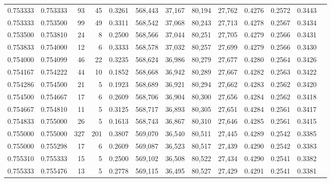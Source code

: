 \begin{tabular}{rrrrrrrrrrrrr}
0.753333 & 0.753333 &    93 &  45 &                                     0.3261 & 568,443 &  37,167 &  80,194 &  27,762 & 0.4276 & 0.2572 & 0.3443 \\
0.753333 & 0.753500 &    99 &  49 &                                     0.3311 & 568,542 &  37,068 &  80,243 &  27,713 & 0.4278 & 0.2567 & 0.3434 \\
0.753500 & 0.753810 &    24 &   8 &                                     0.2500 & 568,566 &  37,044 &  80,251 &  27,705 & 0.4279 & 0.2566 & 0.3431 \\
0.753833 & 0.754000 &    12 &   6 &                                     0.3333 & 568,578 &  37,032 &  80,257 &  27,699 & 0.4279 & 0.2566 & 0.3430 \\
0.754000 & 0.754099 &    46 &  22 &                                     0.3235 & 568,624 &  36,986 &  80,279 &  27,677 & 0.4280 & 0.2564 & 0.3426 \\
0.754167 & 0.754222 &    44 &  10 &                                     0.1852 & 568,668 &  36,942 &  80,289 &  27,667 & 0.4282 & 0.2563 & 0.3422 \\
0.754286 & 0.754500 &    21 &   5 &                                     0.1923 & 568,689 &  36,921 &  80,294 &  27,662 & 0.4283 & 0.2562 & 0.3420 \\
0.754500 & 0.754667 &    17 &   6 &                                     0.2609 & 568,706 &  36,904 &  80,300 &  27,656 & 0.4284 & 0.2562 & 0.3418 \\
0.754667 & 0.754810 &    11 &   5 &                                     0.3125 & 568,717 &  36,893 &  80,305 &  27,651 & 0.4284 & 0.2561 & 0.3417 \\
0.754833 & 0.755000 &    26 &   5 &                                     0.1613 & 568,743 &  36,867 &  80,310 &  27,646 & 0.4285 & 0.2561 & 0.3415 \\
0.755000 & 0.755000 &   327 & 201 &                                     0.3807 & 569,070 &  36,540 &  80,511 &  27,445 & 0.4289 & 0.2542 & 0.3385 \\
0.755000 & 0.755298 &    17 &   6 &                                     0.2609 & 569,087 &  36,523 &  80,517 &  27,439 & 0.4290 & 0.2542 & 0.3383 \\
0.755310 & 0.755333 &    15 &   5 &                                     0.2500 & 569,102 &  36,508 &  80,522 &  27,434 & 0.4290 & 0.2541 & 0.3382 \\
0.755333 & 0.755476 &    13 &   5 &                                     0.2778 & 569,115 &  36,495 &  80,527 &  27,429 & 0.4291 & 0.2541 & 0.3381 \\

\end{tabular}
